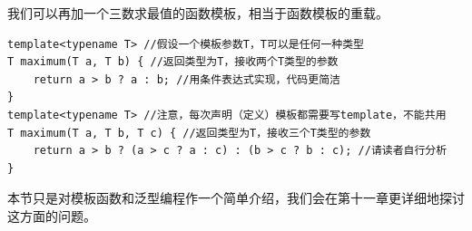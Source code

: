 我们可以再加一个三数求最值的函数模板，相当于函数模板的重载。
\begin{lstlisting}
template<typename T> //假设一个模板参数T，T可以是任何一种类型
T maximum(T a, T b) { //返回类型为T，接收两个T类型的参数
    return a > b ? a : b; //用条件表达式实现，代码更简洁
}
template<typename T> //注意，每次声明（定义）模板都需要写template，不能共用
T maximum(T a, T b, T c) { //返回类型为T，接收三个T类型的参数
    return a > b ? (a > c ? a : c) : (b > c ? b : c); //请读者自行分析
}
\end{lstlisting}
本节只是对模板函数和泛型编程作一个简单介绍，我们会在第十一章更详细地探讨这方面的问题。\par
